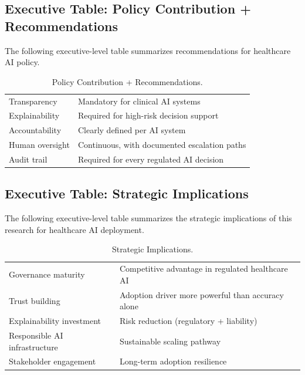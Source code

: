 \subsection{Executive Table: Policy Contribution + Recommendations}
\label{sec:exec_policy_contribution}

\noindent The following executive-level table summarizes recommendations for healthcare AI policy.

{\tablestripes\tablefontsize
{}
\begin{xltabular}{\textwidth}{@{} >{\raggedright\arraybackslash}p{6cm} L @{}}
\caption[Policy Contribution + Recommendations]{Policy Contribution + Recommendations.}\label{tab:exec_policy_contribution} \\
\toprule
{} &  \\
\midrule
\endfirsthead
\endhead
\bottomrule
\endlastfoot
Transparency & Mandatory for clinical AI systems \\
\addlinespace
Explainability & Required for high-risk decision support \\
\addlinespace
Accountability & Clearly defined per AI system \\
\addlinespace
Human oversight & Continuous, with documented escalation paths \\
\addlinespace
Audit trail & Required for every regulated AI decision \\
\end{xltabular}}


\subsection{Executive Table: Strategic Implications}
\label{sec:exec_strategic_implications}

\noindent The following executive-level table summarizes the strategic implications of this research for healthcare AI deployment.

{\tablestripes\tablefontsize
{}
\begin{xltabular}{\textwidth}{@{} >{\raggedright\arraybackslash}p{6cm} L @{}}
\caption[Strategic Implications]{Strategic Implications.}\label{tab:exec_strategic_implications} \\
\toprule
{} &  \\
\midrule
\endfirsthead
\endhead
\bottomrule
\endlastfoot
Governance maturity & Competitive advantage in regulated healthcare AI \\
\addlinespace
Trust building & Adoption driver more powerful than accuracy alone \\
\addlinespace
Explainability investment & Risk reduction (regulatory + liability) \\
\addlinespace
Responsible AI infrastructure & Sustainable scaling pathway \\
\addlinespace
Stakeholder engagement & Long-term adoption resilience \\
\end{xltabular}}



